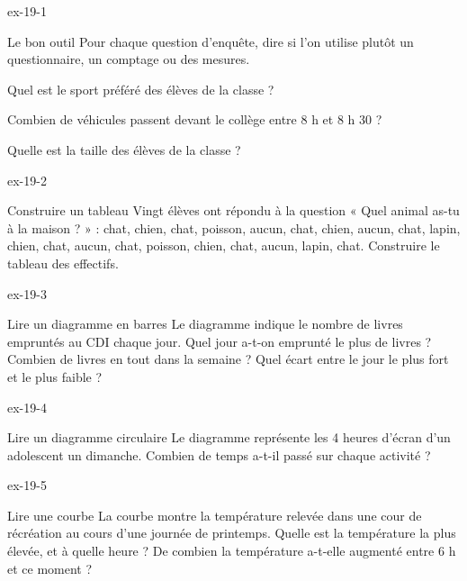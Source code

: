 \clearpage{}
\begin{blocLivre}{ex-19-1}\begin{exercice}[1]{Le bon outil}
Pour chaque question d’enquête, dire si l’on utilise plutôt un questionnaire, un comptage ou des mesures.\begin{questions}
\item Quel est le sport préféré des élèves de la classe ?
\item Combien de véhicules passent devant le collège entre 8 h et 8 h 30 ?
\item Quelle est la taille des élèves de la classe ?
\end{questions}
\end{exercice}\end{blocLivre}
\begin{blocLivre}{ex-19-2}\begin{exercice}[1]{Construire un tableau}
Vingt élèves ont répondu à la question « Quel animal as-tu à la maison ? » : chat, chien, chat, poisson, aucun, chat, chien, aucun, chat, lapin, chien, chat, aucun, chat, poisson, chien, chat, aucun, lapin, chat. Construire le tableau des effectifs.
\end{exercice}\end{blocLivre}
\begin{blocLivre}{ex-19-3}\begin{exercice}[1]{Lire un diagramme en barres}
Le diagramme indique le nombre de livres empruntés au CDI chaque jour. Quel jour a-t-on emprunté le plus de livres ? Combien de livres en tout dans la semaine ? Quel écart entre le jour le plus fort et le plus faible ?
\label{fig-ex-19-3}
\end{exercice}\end{blocLivre}
\begin{blocLivre}{ex-19-4}\begin{exercice}[1]{Lire un diagramme circulaire}
Le diagramme représente les 4 heures d’écran d’un adolescent un dimanche. Combien de temps a-t-il passé sur chaque activité ?
\label{fig-ex-19-4}
\end{exercice}\end{blocLivre}
\begin{blocLivre}{ex-19-5}\begin{exercice}[1]{Lire une courbe}
La courbe montre la température relevée dans une cour de récréation au cours d’une journée de printemps. Quelle est la température la plus élevée, et à quelle heure ? De combien la température a-t-elle augmenté entre 6 h et ce moment ?
\label{fig-ex-19-5}
\end{exercice}\end{blocLivre}


